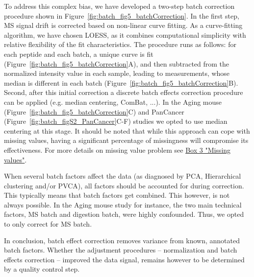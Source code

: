 \documentclass[num-refs]{wiley-article}
\begin{document}
To address this complex bias, we have developed a two-step batch correction procedure shown in Figure~\ref{fig:batch_fig5_batchCorrection}. In the first step, MS signal drift is corrected based on non-linear curve fitting. As a curve-fitting algorithm, we have chosen LOESS, as it combines computational simplicity with relative flexibility of the fit characteristics. The procedure runs as follows: for each peptide and each batch, a unique curve is fit (Figure~\ref{fig:batch_fig5_batchCorrection}A), and then subtracted from the normalized intensity value in each sample, leading to measurements, whose median is different in each batch (Figure~\ref{fig:batch_fig5_batchCorrection}B). Second, after this initial correction a discrete batch effects correction procedure can be applied (e.g. median centering, ComBat, ...). In the Aging mouse (Figure~\ref{fig:batch_fig5_batchCorrection}C) and PanCancer (Figure~\ref{fig:batch_figS2_PanCancer}C-F) studies we opted to use median centering at this stage. It should be noted that while this approach can cope with missing values, having a significant percentage of missingness will compromise its effectiveness. For more details on missing value problem see \hyperref[box:Box3_missingness]{Box 3 "Missing values"}.

When several batch factors affect the data (as diagnosed by PCA, Hierarchical clustering and/or PVCA), all factors should be accounted for during correction. This typically means that batch factors get combined. This however, is not always possible. In the Aging mouse study for instance, the two main technical factors, MS batch and digestion batch, were highly confounded. Thus, we opted to only correct for MS batch.

In conclusion, batch effect correction removes variance from known, annotated batch factors. Whether the adjustment procedures – normalization and batch effects correction – improved the data signal, remains however to be determined by a quality control step.
\end{document}
